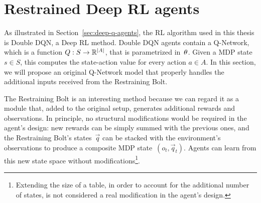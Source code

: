 \begin{comment}
We might argue that the previous example mostly resembles an MDP with
restraining specifications, rather than a POMDP. This is partially true.
However, it all depends on whether we consider this environment to have some
unobservable dynamics, or not. In fact, if we assume these rewards to be
generated by the environment, there must be an unobservable component which
counts how many times the switch has been touched.

Another possible objection could be that reproducing the environment's reward
function is impossible if it is unknown. This is not necessarily true, because
we are those that define the agent's goal and would generate those
``environment's'' rewards. For an unknown function, we mean that a precise
model of that function is not available and cannot be exploited, not that the
rewarded goal is obscure. For example, the rewards of
Example~\ref{ex:rb-light} are unknown, because we don't know the function that
maps \emph{images} to rewards.

\end{comment}


\section{Restrained Deep RL agents}

\label{sec:rb-deep-model}

As illustrated in Section~\ref{sec:deep-q-agents}, the RL algorithm used in
this thesis is Double DQN, a Deep RL method. Double DQN agents contain a
Q-Network, which is a function $Q: S \to \mathbb{R}^{\lvert A\rvert}$, that is parametrized
in~$\theta$. Given a MDP state~$s \in S$, this computes the state-action
value for every action $a \in A$. In this section, we will propose an original
Q-Network model that properly handles the additional inputs received from the
Restraining Bolt.

The Restraining Bolt is an interesting method because we can regard it as a
module that, added to the original setup, generates additional rewards and
observations. In principle, no structural modifications would be required in
the agent's design: new rewards can be simply summed with the previous ones,
and the Restraining Bolt's states~$\vec{q}$ can be stacked with the
environment's observations to produce a composite MDP state~$(o_t,
\vec{q}_t)$. Agents can learn from this new state space without
modifications\footnote{Extending the size of a table, in order to account for
the additional number of states, is not considered a real modification in the
agent's design.}.

